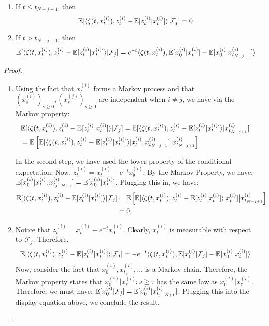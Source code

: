 \begin{lemma}
\label{lemma:martingale_conditioning}

\begin{enumerate}
    \item 
    If $t \leq t_{N-j+1}$, then $$\mathbb{E}[ \langle \zeta(t,x_t^{(i)}) ,z_t^{(i)} - \mathbb{E}[z_t^{(i)}|x_t^{(i)}] \rangle|\mathcal{F}_j] = 0$$
    \item If $t > t_{N-j+1}$, then
    $$\mathbb{E}[ \langle \zeta(t,x_t^{(i)}) ,z_t^{(i)} - \mathbb{E}[z_t^{(i)}|x_t^{(i)}] \rangle|\mathcal{F}_j] =  e^{-t}\langle \zeta(t,x_t^{(i)}), \mathbb{E}[x_0^{(i)}|x_t^{(i)}] - \mathbb{E}[x_0^{(i)}|x_{t_{N-j+1}}^{(i)}] \rangle $$
\end{enumerate}
\end{lemma}
\begin{proof}
\begin{enumerate}
    \item Using the fact that $x_t^{(i)}$ forms a Markov process and that $(x_s^{(i)})_{s\geq 0},(x_s^{(j)})_{s \geq 0}$ are independent when $i \neq j$, we have via the Markov property:
\begin{align}&\mathbb{E}[ \langle \zeta(t,x_t^{(i)}) ,z_t^{(i)} - \mathbb{E}[z_t^{(i)}|x_t^{(i)}] \rangle|\mathcal{F}_j] = \mathbb{E}[ \langle \zeta(t,x_t^{(i)}) ,z_t^{(i)} - \mathbb{E}[z_t^{(i)}|x_t^{(i)}] \rangle|x^{(i)}_{t_{N-j+1}}] \nonumber \\
&= \mathbb{E}\left[\mathbb{E}[ \langle \zeta(t,x_t^{(i)}) ,z_t^{(i)} - \mathbb{E}[z_t^{(i)}|x_t^{(i)}] \rangle|x_t^{(i)},x^{(i)}_{t_{N-j+1}}]\bigr|x^{(i)}_{t_{N-j+1}}\right]
\end{align} 

In the second step, we have used the tower property of the conditional expectation. Now, $z_t^{(i)} = x_t^{(i)}-e^{-t}x_0^{(i)}$. By the Markov Property, we have: $\mathbb{E}[x_0^{(i)}|x_t^{(i)},x_{t_{j-N+1}}^{(i)}] = \mathbb{E}[x_0^{(i)}|x_t^{(i)}]$. Plugging this in, we have: 
\begin{align}\mathbb{E}[ \langle \zeta(t,x_t^{(i)}) ,z_t^{(i)} - \mathbb{E}[z_t^{(i)}|x_t^{(i)}] \rangle|\mathcal{F}_j] 
&= \mathbb{E}\left[\mathbb{E}[ \langle \zeta(t,x_t^{(i)}) ,z_t^{(i)} - \mathbb{E}[z_t^{(i)}|x_t^{(i)}] \rangle|x_t^{(i)}]\bigr|x^{(i)}_{t_{N-j+1}}\right] \nonumber \\
&= 0
\end{align} 

    \item Notice that $z_t^{(i)} = x_t^{(i)}-e^{-t}x_0^{(i)}$. Clearly, $x_t^{(i)}$ is measurable with respect to $\mathcal{F}_j$. Therefore, 
$$\mathbb{E}[ \langle \zeta(t,x_t^{(i)}) ,z_t^{(i)} - \mathbb{E}[z_t^{(i)}|x_t^{(i)}] \rangle|\mathcal{F}_j] = - e^{-t}\langle \zeta(t,x_t^{(i)}), \mathbb{E}[x_0^{(i)}|\mathcal{F}_j] - \mathbb{E}[x_0^{(i)}|x_t^{(i)}] \rangle $$
    Now, consider the fact that $x_0^{(i)},x_{t_1}^{(i)},...$ is a Markov chain. Therefore, the Markov property states that $x_0^{(i)}|x_{s}^{(i)}: s\geq \tau $ has the same law as $x_0^{(i)}| x_{\tau}^{(i)}$. Therefore, we must have: $\mathbb{E}[x_0^{(i)}|\mathcal{F}_j] = \mathbb{E}[x_0^{(i)}|x^{(i)}_{t_{j-N+1}}]$. Plugging this into the display equation above, we conclude the result.
\end{enumerate}
\end{proof}



